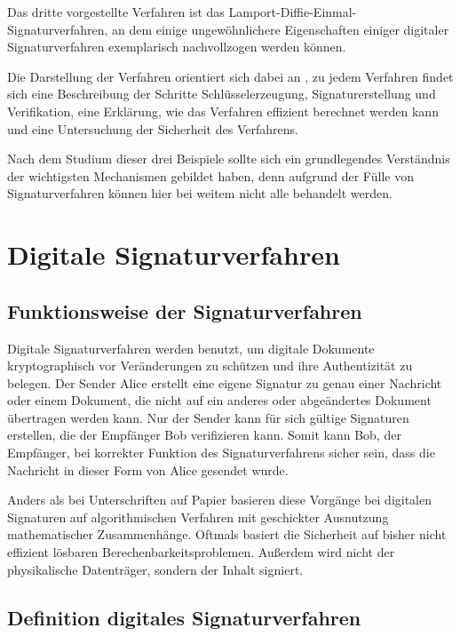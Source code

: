 \documentclass[a4paper,12pt,oneside]{scrreprt}
\begin{document}
Das dritte vorgestellte Verfahren ist das Lamport-Diffie-Einmal-Signaturverfahren, an dem einige ungewöhnlichere Eigenschaften einiger digitaler Signaturverfahren exemplarisch nachvollzogen werden können. 

Die Darstellung der Verfahren orientiert sich dabei an \cite{buchmann2010einfa1}, zu jedem Verfahren findet sich eine Beschreibung der Schritte Schlüsselerzeugung, Signaturerstellung und Verifikation, eine Erklärung, wie das Verfahren effizient berechnet werden kann und eine Untersuchung der Sicherheit des Verfahrens.

Nach dem Studium dieser drei Beispiele sollte sich ein grundlegendes Verständnis der wichtigsten Mechanismen gebildet haben, denn aufgrund der Fülle von Signaturverfahren können hier bei weitem nicht alle behandelt werden. 

\chapter{Digitale Signaturverfahren}

\section{Funktionsweise der Signaturverfahren}

Digitale Signaturverfahren werden benutzt, um digitale Dokumente kryptographisch vor Veränderungen zu schützen und ihre Authentizität zu belegen. Der Sender Alice erstellt eine eigene Signatur zu genau einer Nachricht oder einem Dokument, die nicht auf ein anderes oder abgeändertes Dokument übertragen werden kann. Nur der Sender kann für sich gültige Signaturen erstellen, die der Empfänger Bob verifizieren kann. Somit kann Bob, der Empfänger, bei korrekter Funktion des Signaturverfahrens sicher sein, dass die Nachricht in dieser Form von Alice gesendet wurde. 

Anders als bei Unterschriften auf Papier basieren diese Vorgänge bei digitalen Signaturen auf algorithmischen Verfahren mit geschickter Ausnutzung mathematischer Zusammenhänge. Oftmals basiert die Sicherheit auf bisher nicht effizient lösbaren Berechenbarkeitsproblemen. Außerdem wird nicht der physikalische Datenträger, sondern der Inhalt signiert. 

\section{Definition digitales Signaturverfahren}
\end{document}

